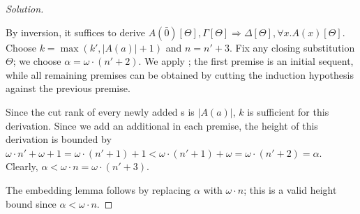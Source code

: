 \documentclass[a4paper]{article}
\begin{document}
\begin{proof}[Solution]
\begin{itemize}
    By inversion, it suffices to derive $A(\bar{0})[\Theta], \Gamma[\Theta] \Rightarrow \Delta[\Theta], \forall x.A(x)[\Theta]$.
    Choose $k = \max(k', |A(a)| + 1)$ and $n = n' + 3$.
    Fix any closing substitution $\Theta$; we choose $\alpha = \omega \cdot (n' + 2)$.
    We apply \rRo; the first premise is an initial sequent, while all remaining premises can be obtained by cutting the induction hypothesis against the previous premise.
    \begin{mathpar}
    \end{mathpar}
    Since the cut rank of every newly added \rCut{}s is $|A(a)|$, $k$ is sufficient for this derivation.
    Since we add an additional \rCut{} in each premise, the height of this derivation is bounded by $\omega \cdot n' + \omega + 1 = \omega \cdot (n' + 1) + 1 < \omega \cdot (n' + 1) + \omega = \omega \cdot (n' + 2) = \alpha$.
    Clearly, $\alpha < \omega \cdot n = \omega \cdot (n' + 3)$.
  \end{itemize}
  The embedding lemma follows by replacing $\alpha$ with $\omega \cdot n$; this is a valid height bound since $\alpha < \omega \cdot n$.
\end{proof}

% 
% 
\end{document}

